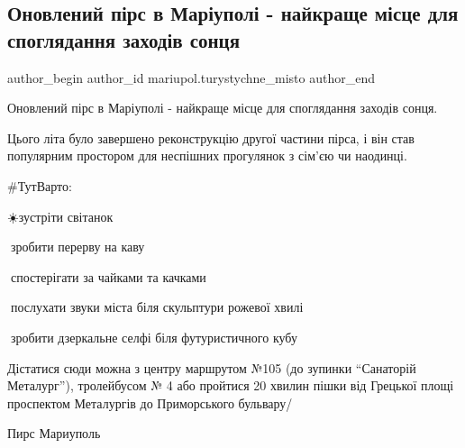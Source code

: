  
 
 
 
 

\subsection{Оновлений пірс  в Маріуполі - найкраще місце для споглядання заходів сонця}
\label{sec:25_11_2021.fb.mariupol.turystychne_misto.1.pirs_zahody_soncja}

\ifcmt
 author_begin
   author_id mariupol.turystychne_misto
 author_end
\fi

Оновлений пірс  в Маріуполі - найкраще місце для споглядання заходів сонця. 

Цього літа було завершено реконструкцію другої частини пірса, і він став
популярним простором для неспішних прогулянок з сім'єю чи наодинці.

\#ТутВарто:

☀️зустріти світанок\par
🥤зробити перерву на каву \par
🦆спостерігати за чайками та качками\par
🌊послухати звуки міста біля скульптури рожевої хвилі\par
📸зробити дзеркальне селфі біля футуристичного кубу\par

Дістатися сюди можна з центру маршрутом №105 (до зупинки \enquote{Санаторій Металург}),
тролейбусом № 4 або пройтися 20 хвилин пішки від Грецької площі проспектом
Металургів до Приморського бульвару/

Пирс Мариуполь
